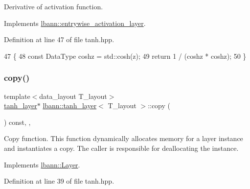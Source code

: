 Derivative of activation function. 

Implements \hyperlink{classlbann_1_1entrywise__activation__layer_a7676a4c5060452a38264993554e79f8e}{lbann\+::entrywise\+\_\+activation\+\_\+layer}.



Definition at line 47 of file tanh.\+hpp.


\begin{DoxyCode}
47                                                             \{
48     \textcolor{keyword}{const} DataType coshz = std::cosh(z);
49     \textcolor{keywordflow}{return} 1 / (coshz * coshz);
50   \}
\end{DoxyCode}
\mbox{\label{classlbann_1_1tanh__layer_ad42d3814131e6d8588c1cb4bfba8ebb6}} 
\subsubsection{\texorpdfstring{copy()}{copy()}}
{\footnotesize\ttfamily template$<$data\+\_\+layout T\+\_\+layout$>$ \\
\hyperlink{classlbann_1_1tanh__layer}{tanh\+\_\+layer}$\ast$ \hyperlink{classlbann_1_1tanh__layer}{lbann\+::tanh\+\_\+layer}$<$ T\+\_\+layout $>$\+::copy (\begin{DoxyParamCaption}{ }\end{DoxyParamCaption}) const\hspace{0.3cm}{\ttfamily [inline]}, {\ttfamily [override]}, {\ttfamily [virtual]}}

Copy function. This function dynamically allocates memory for a layer instance and instantiates a copy. The caller is responsible for deallocating the instance. 

Implements \hyperlink{classlbann_1_1Layer_af420f22bbac801c85483ade84588a23f}{lbann\+::\+Layer}.



Definition at line 39 of file tanh.\+hpp.


